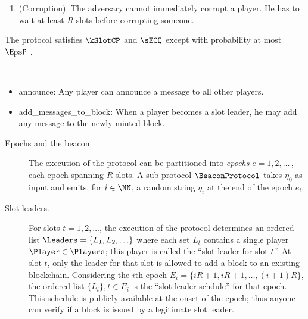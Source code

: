 \begin{minipage}[c]{\textwidth}
\begin{framed}
\begin{description}[labelindent=0cm,leftmargin=0cm]
\begin{enumerate}[label=(\roman*.),labelindent=0cm]
				\item (Corruption). The adversary cannot immediately corrupt a player. 
				He has to wait at least $R$ slots before corrupting someone.
			\end{enumerate}


			\item[Guarantees.] 
				The protocol satisfies $\kSlotCP$ and $\sECQ$ except with probability at most 
				$\EpsP$
				. 
			

			\item[Exposed functionalities.]~
			\begin{itemize}[label=-,labelindent=0cm,leftmargin=0.5cm]
				\item \textsf{announce}: Any player can announce a message 
				to all other players.  

				\item \textsf{add\_messages\_to\_block}: When a player becomes a slot leader, he may add any message to the newly minted block.
			\end{itemize}
		\end{description}


		\dotfill

		\begin{description}
			\item[Epochs and the beacon.]
			The execution of the protocol can be partitioned into \emph{epochs} $e = 1, 2, \ldots$\,, 
			each epoch spanning $R$ slots. 
			A sub-protocol $\BeaconProtocol$ takes $\eta_0$ as input and emits, for $i \in \NN$,
			a random string $\eta_i$ at the end of the epoch $e_i$.

			\item[Slot leaders.]
			For slots $t = 1, 2, \ldots$, the execution of the protocol 
			determines an ordered list $\Leaders = \{L_1, L_2, \ldots\}$ 
			where each set $L_t$ contains a single player $\Player \in \Players$; 
			this player is called the ``slot leader for slot $t$.'' 
			At slot $t$, only the leader for that slot 
			is allowed to add a block to an existing blockchain. 
			Considering the $i$th epoch $E_i = \{iR + 1, iR + 1, \ldots, (i+1)R\}$, 
			the ordered list $\{L_t\}, t \in E_i$ is the ``slot leader schdule'' for that epoch.
			This schedule is publicly available at the onset of the epoch; 
			thus anyone can verify if a block is issued by a legitimate slot leader.


\end{description}
\end{framed}
\end{minipage}
